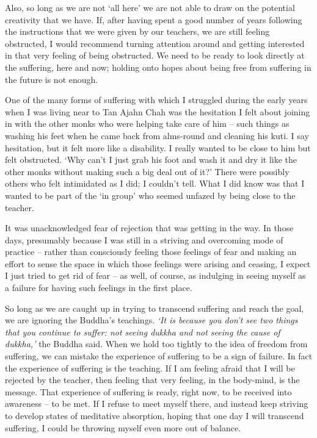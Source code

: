 Also, so long as we are not `all here' we are not able to draw on the
potential creativity that we have. If, after having spent a good number
of years following the instructions that we were given by our teachers,
we are still feeling obstructed, I would recommend turning attention
around and getting interested in that very feeling of being obstructed.
We need to be ready to look directly at the suffering, here and now;
holding onto hopes about being free from suffering in the future is not
enough.

One of the many forms of suffering with which I struggled during the
early years when I was living near to Tan Ajahn Chah was the hesitation
I felt about joining in with the other monks who were helping take care
of him -- such things as washing his feet when he came back from
alms-round and cleaning his kuti. I say hesitation, but it felt more
like a disability. I really wanted to be close to him but felt
obstructed. `Why can't I just grab his foot and wash it and dry it like
the other monks without making such a big deal out of it?' There were
possibly others who felt intimidated as I did; I couldn't tell. What I
did know was that I wanted to be part of the `in group' who seemed
unfazed by being close to the teacher.

It was unacknowledged fear of rejection that was getting in the way. In
those days, presumably because I was still in a striving and overcoming
mode of practice -- rather than consciously feeling those feelings of
fear and making an effort to sense the space in which those feelings
were arising and ceasing, I expect I just tried to get rid of fear -- as
well, of course, as indulging in seeing myself as a failure for having
such feelings in the first place.

So long as we are caught up in trying to transcend suffering and reach
the goal, we are ignoring the Buddha's teachings. \emph{`It is because
you don't see two things that you continue to suffer: not seeing dukkha
and not seeing the cause of dukkha,'} the Buddha said. When we hold too
tightly to the idea of freedom from suffering, we can mistake the
experience of suffering to be a sign of failure. In fact the experience
of suffering is the teaching. If I am feeling afraid that I will be
rejected by the teacher, then feeling that very feeling, in the
body-mind, is the message. That experience of suffering is ready, right
now, to be received into awareness -- to be met. If I refuse to meet
myself there, and instead keep striving to develop states of meditative
absorption, hoping that one day I will transcend suffering, I could be
throwing myself even more out of balance.

